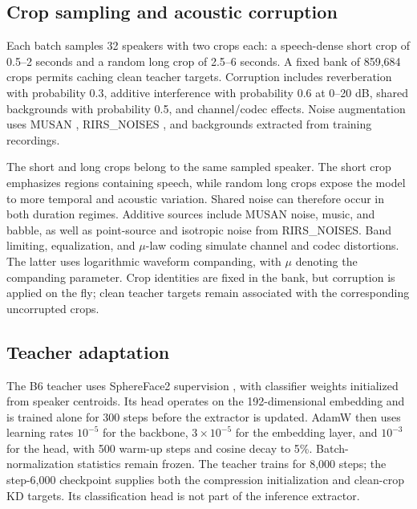 \documentclass[11pt]{article}
\begin{document}
\subsection{Crop sampling and acoustic corruption}
Each batch samples 32 speakers with two crops each: a speech-dense short crop of 0.5--2 seconds and a random long crop of 2.5--6 seconds. A fixed bank of 859,684 crops permits caching clean teacher targets. Corruption includes reverberation with probability 0.3, additive interference with probability 0.6 at 0--20 dB, shared backgrounds with probability 0.5, and channel/codec effects. Noise augmentation uses MUSAN \citep{snyder2015musan}, RIRS\_NOISES \citep{ko2017augmentation}, and backgrounds extracted from training recordings.

The short and long crops belong to the same sampled speaker. The short crop emphasizes regions containing speech, while random long crops expose the model to more temporal and acoustic variation. Shared noise can therefore occur in both duration regimes. Additive sources include MUSAN noise, music, and babble, as well as point-source and isotropic noise from RIRS\_NOISES. Band limiting, equalization, and $\mu$-law coding simulate channel and codec distortions. The latter uses logarithmic waveform companding, with $\mu$ denoting the companding parameter. Crop identities are fixed in the bank, but corruption is applied on the fly; clean teacher targets remain associated with the corresponding uncorrupted crops.

\subsection{Teacher adaptation}
The B6 teacher uses SphereFace2 supervision \citep{wen2022sphereface2}, with classifier weights initialized from speaker centroids. Its head operates on the 192-dimensional embedding and is trained alone for 300 steps before the extractor is updated. AdamW then uses learning rates $10^{-5}$ for the backbone, $3\!\times\!10^{-5}$ for the embedding layer, and $10^{-3}$ for the head, with 500 warm-up steps and cosine decay to 5\%. Batch-normalization statistics remain frozen. The teacher trains for 8,000 steps; the step-6,000 checkpoint supplies both the compression initialization and clean-crop KD targets. Its classification head is not part of the inference extractor.
\end{document}
